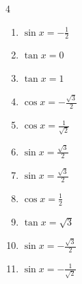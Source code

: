 \begin{multicols}{4}
\begin{enumerate}

  \item $\displaystyle \sin{x}  = -\frac{1}{2}$


  \item $\displaystyle \tan{x}  = 0$


  \item $\displaystyle \tan{x}  = 1$


  \item $\displaystyle \cos{x}  = -\frac{\sqrt{3}}{2}$


  \item $\displaystyle \cos{x}  = \frac{1}{\sqrt{2}}$


  \item $\displaystyle \sin{x}  = \frac{\sqrt{3}}{2}$


  \item $\displaystyle \sin{x}  = \frac{\sqrt{3}}{2}$


\columnbreak %

  \item $\displaystyle \cos{x}  = \frac{1}{2}$


  \item $\displaystyle \tan{x}  = \sqrt{3}$


  \item $\displaystyle \sin{x}  = -\frac{\sqrt{3}}{2}$


  \item $\displaystyle \sin{x}  = -\frac{1}{\sqrt{2}}$


\end{enumerate}
\end{multicols}
